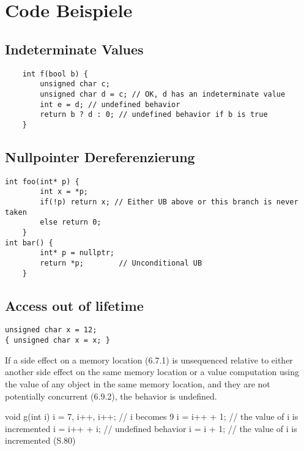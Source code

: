 \lstset{language=cpp}

\section{Code Beispiele}
\label{sec:codebsp}

\subsection{Indeterminate Values}
\label{subsec:indeterminate}
\begin{lstlisting}
    int f(bool b) {
        unsigned char c;
        unsigned char d = c; // OK, d has an indeterminate value
        int e = d; // undefined behavior
        return b ? d : 0; // undefined behavior if b is true
    }
\end{lstlisting}
\cite[S.63 f.]{book:cpp-standard}

\subsection{Nullpointer Dereferenzierung}
\label{subsec:nullpointer}

\begin{lstlisting}
int foo(int* p) {
        int x = *p;
        if(!p) return x; // Either UB above or this branch is never taken
        else return 0;
    }
int bar() {
        int* p = nullptr;
        return *p;        // Unconditional UB
    }
\end{lstlisting}
\cite{misc:cpp-undefined}

\subsection{Access out of lifetime}
\label{subsec:outside-lifetime}

\begin{lstlisting}
unsigned char x = 12;
{ unsigned char x = x; }
\end{lstlisting}
\cite[S.35]{book:cpp-standard}

If a side effect on a memory location (6.7.1) is unsequenced relative to either another
side effect on the same memory location or a value computation using the value of any object in the same
memory location, and they are not potentially concurrent (6.9.2), the behavior is undefined.

void g(int i) {
        i = 7, i++, i++; // i becomes 9
        i = i++ + 1; // the value of i is incremented
        i = i++ + i; // undefined behavior
        i = i + 1; // the value of i is incremented
    }
(S.80)